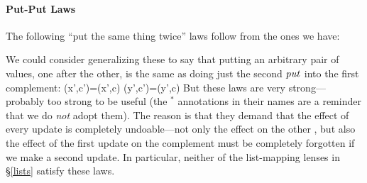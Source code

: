 \iffull
\paragraph*{Put-Put Laws}

\begin{lemma} The following ``put the same thing twice'' laws follow from
the ones we have:
\end{lemma}

We could consider generalizing these to say that putting an arbitrary pair
of values, one after the other, is the same as doing just the second $\mathit{put}$
into the first complement:
{
 {\putr(x',c')=\putr(x',c)}
 {\putl(y',c')=\putl(y',c)}
}
%
But these laws are very strong---probably too strong to be useful (the
$^\ast$ annotations in their names are a reminder that we do {\em not} adopt
them).  The reason is that they demand that the effect of every update is
completely undoable---not only the effect on the other \replica, but also the
effect of the first update on the complement must be completely forgotten if
we make a second update.  In particular, neither of the list-mapping lenses
in \S\ref{lists} satisfy these laws.
\fi


